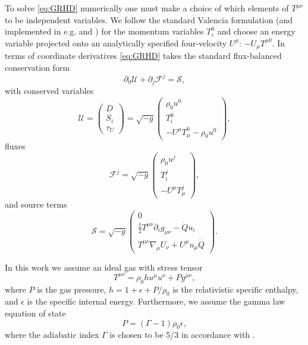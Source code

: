 \documentclass{emulateapj}
\newcommand{\Gam}{\Gamma}
\newcommand{\eps}{\epsilon}
\newcommand{\pd}{\partial}
\begin{document}
To solve \eqref{eq:GRHD} numerically one must make a choice of which elements of $T^{\mu\nu}$ to be independent variables.  We follow the standard Valencia formulation \citep{Marti91, Banyuls97,Font08} (and implemented in e.g. \cite{HARM} and \cite{Duez05}) for the momentum variables $T^0_i$ and choose an energy variable projected onto an analytically specified four-velocity $U^\mu$: $-U_\mu T^{\mu 0}$.
In terms of coordinate derivatives \eqref{eq:GRHD} takes the standard flux-balanced conservation form
\begin{equation}
    \pd_0 \mathcal{U} + \pd_j \mathcal{F}^j = \mathcal{S} , \label{eq:consLaw}
\end{equation}
with conserved variables
\begin{equation}
    \mathcal{U} = \begin{pmatrix} D \\
                            S_i \\
                            \tau_U
                \end{pmatrix} = \sqrt{-g} \begin{pmatrix} \rho_0 u^0 \\ 
                                                    T^0_i \\
                                                    -U^\mu T_\mu^0 - \rho_0 u^0 \end{pmatrix} , \label{eq:cons}
\end{equation}
fluxes
\begin{equation}
    \mathcal{F}^j = \sqrt{-g} \begin{pmatrix} \rho_0 u^j \\
                                                T^j_i \\
                                                -U^\mu T_\mu^j \end{pmatrix} ,\label{eq:fluxes}
\end{equation}
and source terms 
\begin{equation}
    \mathcal{S} = \sqrt{-g} \begin{pmatrix} 0 \\
                        \frac{1}{2}T^{\mu\nu}\pd_i g_{\mu\nu} - \dot{Q}u_i \\
                        T^{\mu\nu}\nabla_\mu U_\nu + U^\mu u_\mu \dot{Q} \end{pmatrix} .\label{eq:sources}
\end{equation}

In this work we assume an ideal gas with stress tensor
\begin{equation}
	T^{\mu\nu} = \rho_0 h u^\mu u^\nu + P g^{\mu\nu} ,
\end{equation}
where $P$ is the gas pressure, $h = 1 + \eps + P/\rho_0$ is the relativistic specific enthalpy, and $\eps$ is the specific internal energy. Furthermore, we assume the gamma law equation of state
\begin{equation}
	P = (\Gam - 1) \rho_0 \eps , \label{eq:gammalaw}
\end{equation}
where the adiabatic index $\Gamma$ is chosen to be 5/3 in accordance with \cite{Farris14}.
\end{document}
